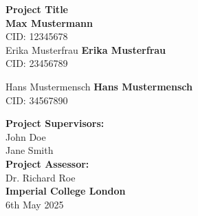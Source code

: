 \documentclass[english,twocolumn]{scrartcl}
\newcommand{\projectTitle}{Project Title}
\newcommand{\projectDeadline}{6th May 2025}
\newcommand{\studentOneName}{Max Mustermann}
\newcommand{\studentOneCID}{12345678}
\newcommand{\studentTwoName}{Erika Musterfrau}      %
\newcommand{\studentTwoCID}{23456789}
\newcommand{\studentThreeName}{Hans Mustermensch}   %
\newcommand{\studentThreeCID}{34567890}
\newcommand{\projectSupervisors}{John Doe\\Jane Smith}
\newcommand{\projectAssessor}{Dr. Richard Roe}
\begin{document}
\begin{titlepage}
    \centering
    \vspace*{2.5cm}
    {\Huge \textbf{\projectTitle}}\\[4cm]

    {\Large \textbf{\studentOneName}}\\
    CID: \studentOneCID\\[1cm]

    \ifdefined\studentTwoName
        {\Large \textbf{\studentTwoName}}\\
        CID: \studentTwoCID\\[1cm]
    \fi

    \ifdefined\studentThreeName
        {\Large \textbf{\studentThreeName}}\\
        CID: \studentThreeCID\\[1cm]
    \fi

    \vspace{1cm}

    \textbf{Project Supervisors:}\\\projectSupervisors\\[1cm]

    \textbf{Project Assessor:}\\\projectAssessor\\[1cm]
    \vfill
    \textbf{Imperial College London}\\
    \projectDeadline
\end{titlepage}

\onecolumn
{}
\setcounter{page}{2}

\newpage

\onecolumn
\tableofcontents
\newpage



\clearpage

\twocolumn
{}
\setcounter{page}{1}




\clearpage

\onecolumn
{}
\setcounter{page}{4}

\newpage

\onecolumn
\appendix

\end{document}
